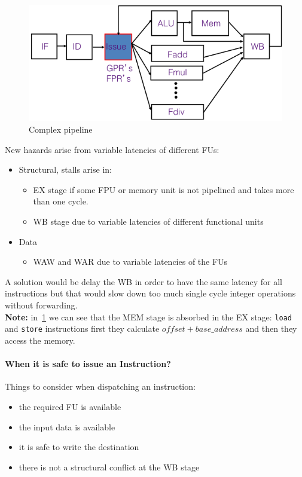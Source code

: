 \begin{figure}[h]
    \centering
    \includegraphics[scale = 0.4]{images/complex-pipeline}
    \caption{Complex pipeline}
    \label{fig:complex-pipeline}
\end{figure}

New hazards arise from variable latencies of different FUs:
\begin{itemize}
    \item Structural, stalls arise in:
    \begin{itemize}
        \item EX stage if some FPU or memory unit is not pipelined and takes more than one cycle.
        \item WB stage due to variable latencies of different functional units
    \end{itemize}
    \item Data
    \begin{itemize}
        \item WAW and WAR due to variable latencies of the FUs
    \end{itemize}
\end{itemize}

A solution would be delay the WB in order to have the same latency for all instructions but that would slow down too
much single cycle integer operations without forwarding.\\
\textbf{Note:} in~\ref{fig:complex-pipeline} we can see that the MEM stage is absorbed in the EX stage:
\verb|load| and \verb|store| instructions first they calculate \(offset + base\_address\) and then they access the
memory.

\paragraph{When it is safe to issue an Instruction?} Things to consider when dispatching an instruction:
\begin{itemize}
    \item the required FU is available
    \item the input data is available
    \item it is safe to write the destination
    \item there is not a structural conflict at the WB stage
\end{itemize}

